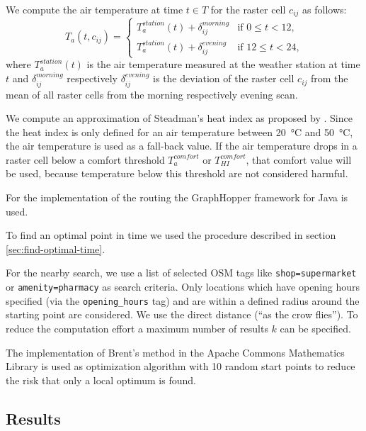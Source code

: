 We compute the air temperature at time $t\in T$ for the raster cell $c_{ij}$ as follows:
\begin{equation}
\label{eq:derived-temperature}
T_a(t, c_{ij}) = \begin{cases}
T_{a}^{station}(t) + \delta_{ij}^{morning} & \text{if $0 \leq t < 12$,}\\
T_{a}^{station}(t) + \delta_{ij}^{evening} & \text{if $12 \leq t < 24$,}
\end{cases}
\end{equation}
where $T_{a}^{station}(t)$ is the air temperature measured at the weather station at time $t$ and $\delta^{morning}_{ij}$ respectively  $\delta^{evening}_{ij}$ is the deviation of the raster cell $c_{ij}$ from the mean of all raster cells from the morning respectively evening scan.

We compute an approximation of Steadman's heat index as proposed by \textcite[77]{Stull2011}. Since the heat index is only defined for an air temperature between \SI{20}{\celsius} and \SI{50}{\celsius}, the air temperature is used as a fall-back value. If the air temperature drops in a raster cell below a comfort threshold $T_a^{comfort}$ or $T_{HI}^{comfort}$, that comfort value will be used, because temperature below this threshold are not considered harmful. 

For the implementation of the routing the GraphHopper framework for Java \parencite{GraphHopper2016} is used.


To find an optimal point in time we used the procedure described in section \ref{sec:find-optimal-time}.  

For the nearby search, we use a list of selected OSM tags like \verb|shop=supermarket| or \verb|amenity=pharmacy| as search criteria. Only locations which have opening hours specified (via the \verb|opening_hours| tag) and are within a defined radius around the starting point are considered. We use the direct distance (“as the crow flies”). To reduce the computation effort a maximum number of results $k$ can be specified.

The implementation of Brent's method in the Apache Commons Mathematics Library \parencite{ASF2016} is used as optimization algorithm with 10 random start points to reduce the risk that only a local optimum is found.

\subsection{Results}

